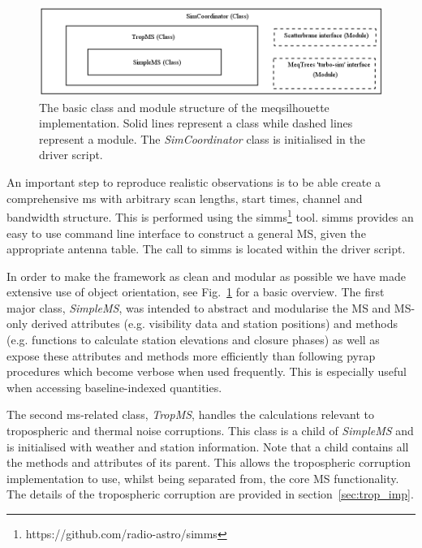 

\begin{figure}
\includegraphics[width=\columnwidth]{Images/Class_module_structure}
\caption[The basic class and module structure of the {\sc meqsilhouette} implementation.]{The basic class and module structure of the {\sc meqsilhouette} implementation. Solid lines represent a class while dashed lines represent a module. The \emph{SimCoordinator} class is initialised in the driver script. \label{class_struc}%
}
\end{figure}

An important step to reproduce realistic observations is to be able create a comprehensive {\sc ms} with arbitrary scan lengths, start times, channel and bandwidth structure. This is performed using the {\sc simms}\footnote{https://github.com/radio-astro/simms} tool. {\sc simms} provides an easy to use command line interface to construct a general MS, given the appropriate antenna table. The call to {\sc simms} is located within the driver script. 

In order to make the framework as clean and  modular as possible we have made extensive use of object orientation, see Fig.~\ref{class_struc} for a basic overview. The first major class, \emph{SimpleMS}, was intended to abstract and modularise the MS and MS-only derived attributes (e.g. visibility data and station positions) and methods (e.g. functions to calculate station elevations and closure phases) as well as expose these attributes and methods more efficiently than following {\sc pyrap} procedures which become verbose when used frequently. This is especially useful when accessing baseline-indexed quantities. 

The second {\sc ms}-related class, \emph{TropMS}, handles the calculations relevant to tropospheric and thermal noise corruptions. This class is a child of {\it SimpleMS} and is initialised with weather and station information. Note that a child contains all the methods and attributes of its parent. This allows the tropospheric corruption implementation to use, whilst being separated from, the core MS functionality. The details of the tropospheric corruption are provided in section~\ref{sec:trop_imp}. 

